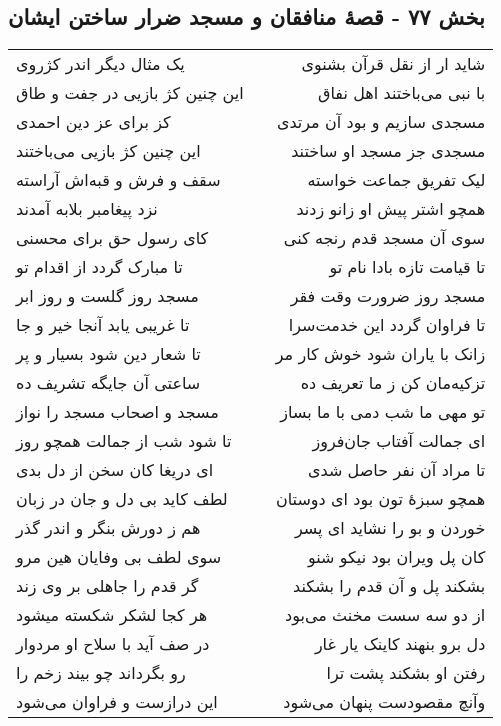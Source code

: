 \begin{center}
\section*{بخش ۷۷ - قصهٔ منافقان و مسجد ضرار ساختن ایشان}
\label{sec:sh077}
\begin{longtable}{l p{0.5cm} r}
یک مثال دیگر اندر کژروی
&&
شاید ار از نقل قرآن بشنوی
\\
این چنین کژ بازیی در جفت و طاق
&&
با نبی می‌باختند اهل نفاق
\\
کز برای عز دین احمدی
&&
مسجدی سازیم و بود آن مرتدی
\\
این چنین کژ بازیی می‌باختند
&&
مسجدی جز مسجد او ساختند
\\
سقف و فرش و قبه‌اش آراسته
&&
لیک تفریق جماعت خواسته
\\
نزد پیغامبر بلابه آمدند
&&
همچو اشتر پیش او زانو زدند
\\
کای رسول حق برای محسنی
&&
سوی آن مسجد قدم رنجه کنی
\\
تا مبارک گردد از اقدام تو
&&
تا قیامت تازه بادا نام تو
\\
مسجد روز گلست و روز ابر
&&
مسجد روز ضرورت وقت فقر
\\
تا غریبی یابد آنجا خیر و جا
&&
تا فراوان گردد این خدمت‌سرا
\\
تا شعار دین شود بسیار و پر
&&
زانک با یاران شود خوش کار مر
\\
ساعتی آن جایگه تشریف ده
&&
تزکیه‌مان کن ز ما تعریف ده
\\
مسجد و اصحاب مسجد را نواز
&&
تو مهی ما شب دمی با ما بساز
\\
تا شود شب از جمالت همچو روز
&&
ای جمالت آفتاب جان‌فروز
\\
ای دریغا کان سخن از دل بدی
&&
تا مراد آن نفر حاصل شدی
\\
لطف کاید بی دل و جان در زبان
&&
همچو سبزهٔ تون بود ای دوستان
\\
هم ز دورش بنگر و اندر گذر
&&
خوردن و بو را نشاید ای پسر
\\
سوی لطف بی وفایان هین مرو
&&
کان پل ویران بود نیکو شنو
\\
گر قدم را جاهلی بر وی زند
&&
بشکند پل و آن قدم را بشکند
\\
هر کجا لشکر شکسته میشود
&&
از دو سه سست مخنث می‌بود
\\
در صف آید با سلاح او مردوار
&&
دل برو بنهند کاینک یار غار
\\
رو بگرداند چو بیند زخم را
&&
رفتن او بشکند پشت ترا
\\
این درازست و فراوان می‌شود
&&
وآنچ مقصودست پنهان می‌شود
\\
\end{longtable}
\end{center}
